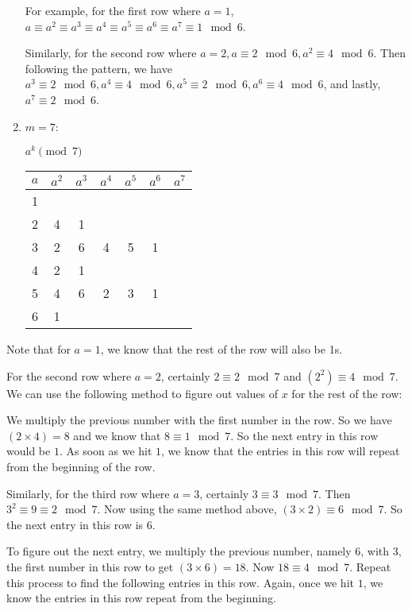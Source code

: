 \begin{enumerate}
For example, for the first row where $a=1$, $a \equiv a^2 \equiv a^3 \equiv a^4 \equiv a^5 \equiv a^6 \equiv a^7 \equiv 1 \mod 6$.

Similarly, for the second row where $a=2, a \equiv 2 \mod 6, a^2 \equiv 4 \mod 6$. Then following the pattern, we have $a^3 \equiv 2 \mod 6, a^4 \equiv 4 \mod 6, a^5 \equiv 2 \mod 6, a^6 \equiv 4 \mod 6$, and lastly, $a^7 \equiv 2 \mod 6$.
\item $m = 7$:

$a^k \pmod{7}$
\begin{tabular}{|c | c | c| c| c| c | c|}
\hline
$a$ & $a^2$ & $a^3$ & $a^4$& $a^5$& $a^6$ & $a^7$ \\
\hline
1	&  &	&	&	&	&	\\
\hline
2	& 4 & 1	&	&	&	&	\\
\hline
3	& 2 & 6	& 4	& 5	& 1	&	\\
\hline
4	& 2 & 1	&	&	&	&	\\
\hline
5	& 4 & 6	& 2	& 3	& 1	&	\\
\hline
6	& 1 &	&	&	&	&	\\
\hline
\end{tabular}
\end{enumerate}


\item Note that for $a=1$, we know that the rest of the row will also be 1s.
\item For the second row where $a=2$, certainly $2 \equiv 2 \mod 7$ and $(2^2) \equiv 4 \mod 7$. We can use the following method to figure out values of $x$ for the rest of the row:
\item We multiply the previous number with the first number in the row. So we have $(2 \times 4) = 8$ and we know that $8 \equiv 1 \mod 7$. So the next entry in this row would be $1$. As soon as we hit $1$, we know that the entries in this row will repeat from the beginning of the row. 
\item Similarly, for the third row where $a=3$, certainly $3 \equiv 3 \mod 7$. Then $3^2 \equiv 9 \equiv 2 \mod 7$. Now using the same method above, $(3 \times 2) \equiv 6 \mod 7$. So the next entry in this row is $6$. 
\item To figure out the next entry, we multiply the previous number, namely $6$, with $3$, the first number in this row to get $(3 \times 6) = 18$. Now $18 \equiv 4 \mod 7$. Repeat this process to find the following entries in this row. Again, once we hit $1$, we know the entries in this row repeat from the beginning.
\item 

